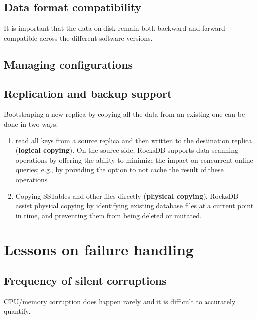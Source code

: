\documentclass[11pt]{article}
\begin{document}
\subsection{Data format compatibility}
\label{sec:orge4fc426}
It is important that the data on disk remain both backward and forward compatible across the different
software versions.
\subsection{Managing configurations}
\label{sec:org77edd22}
\subsection{Replication and backup support}
\label{sec:orge2a99b1}
Bootstraping a new replica by copying all the data from an existing one can be done in two ways:
\begin{enumerate}
\item read all keys from a source replica and then written to the destination replica (\textbf{logical copying}).
On the source side, RocksDB supports data scanning operations by offering the ability to minimize
the impact on concurrent online queries; e.g., by providing the option to not cache the result of
these operations
\item Copying SSTables and other files directly (\textbf{physical copying}). RocksDB assist physical copying by
identifying existing database files at a current point in time, and preventing them from being
deleted or mutated.
\end{enumerate}
\section{Lessons on failure handling}
\label{sec:orga9052b4}
\subsection{Frequency of silent corruptions}
\label{sec:org9390862}
CPU/memory corruption does happen rarely and it is difficult to accurately quantify.
\end{document}
